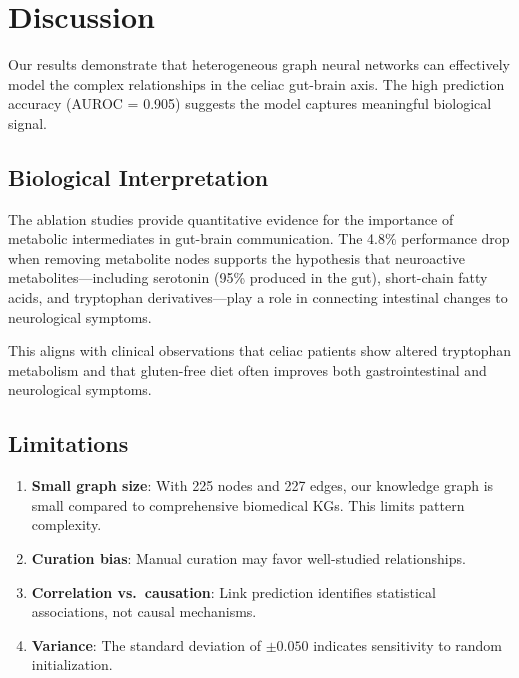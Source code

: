 \documentclass[12pt]{article}
\begin{document}
\section{Discussion}

Our results demonstrate that heterogeneous graph neural networks can effectively model the complex relationships in the celiac gut-brain axis. The high prediction accuracy (AUROC = 0.905) suggests the model captures meaningful biological signal.

\subsection{Biological Interpretation}

The ablation studies provide quantitative evidence for the importance of metabolic intermediates in gut-brain communication. The 4.8\% performance drop when removing metabolite nodes supports the hypothesis that neuroactive metabolites---including serotonin (95\% produced in the gut), short-chain fatty acids, and tryptophan derivatives---play a role in connecting intestinal changes to neurological symptoms.

This aligns with clinical observations that celiac patients show altered tryptophan metabolism \citep{russo2012tryptophan} and that gluten-free diet often improves both gastrointestinal and neurological symptoms.

\subsection{Limitations}

\begin{enumerate}
    \item \textbf{Small graph size}: With 225 nodes and 227 edges, our knowledge graph is small compared to comprehensive biomedical KGs. This limits pattern complexity.
    
    \item \textbf{Curation bias}: Manual curation may favor well-studied relationships.
    
    \item \textbf{Correlation vs.\ causation}: Link prediction identifies statistical associations, not causal mechanisms.
    
    \item \textbf{Variance}: The standard deviation of $\pm 0.050$ indicates sensitivity to random initialization.
\end{enumerate}
\end{document}
